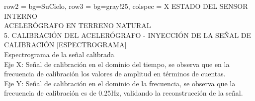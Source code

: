\begin{table}[H]
    \begin{tblr}{
        row{2} = {bg=SuCielo},
        row{3} = {bg=gray!25},
        colspec = {X}
    }
        ESTADO DEL SENSOR INTERNO \\
        ACELERÓGRAFO EN TERRENO NATURAL \\
        5. CALIBRACIÓN DEL ACELERÓGRAFO - INYECCIÓN DE LA SEÑAL DE CALIBRACIÓN [ESPECTROGRAMA] \\
        {
            Espectrograma de la señal calibrada \\
            Eje X: Señal de calibración en el dominio del tiempo, se observa que en la frecuencia de calibración los valores de amplitud en términos de cuentas. \\
            Eje Y: Señal de calibración en el dominio de la frecuencia, se observa que la frecuencia de calibración es de 0.25Hz, validando la reconstrucción de la señal.
        } \\
    \end{tblr}
\end{table}



